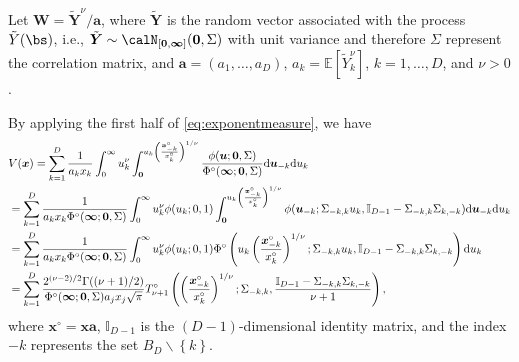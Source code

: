 \documentclass[12pt]{article}
\begin{document}
Let $\bm W= \tilde{\bm Y}^{\nu} / \bm a$, where $\tilde{\bm Y}$ is the random vector associated with the process $\tilde{Y}(\bs)$, i.e., $\tilde{\bm Y} \sim \calN_{\left[ \bm 0, \bm \infty\right]}(\bm 0, \Sigma)$ with unit variance and therefore $\Sigma$ represent the correlation matrix, and $\bm a = (a_1, \ldots, a_D)$, $a_k=\mathbb E[\tilde Y_k^\nu]$, $k=1, \ldots, D$, and $\nu>0$.

By applying the first half of \eqref{eq:exponentmeasure}, we have 
\begin{align}
& V(\bm x) = \sum_{k=1}^D\frac{1}{a_kx_k}\int_0^\infty u_k^\nu \int_{\bm 0}^{u_k \left(\frac{\bm x_{-k}^\circ}{x_{k}^\circ}\right)^{1/\nu}} \frac{\phi(\bm u;\bm 0, \Sigma)}{\Phi^\circ(\bm \infty;\bm 0, \Sigma)}\text d \bm u_{-k}\text d u_k \nonumber \\ 
&=\sum_{k=1}^D\frac{1}{a_k x_k \Phi^\circ(\bm \infty;\bm 0, \Sigma)}\int_0^\infty u_k^\nu \phi(u_k;0, 1) \int_{\bm 0}^{u_k\left(\frac{\bm x_{-k}^\circ}{x_k^\circ}\right)^{1/\nu}}\phi(\bm u_{-k}; \Sigma_{-k,k}u_k, \mathbb{I}_{D-1}-\Sigma_{-k,k}\Sigma_{k,-k})\text d \bm u_{-k}\text d u_k \nonumber \\ 
&=\sum_{k=1}^D\frac{1}{a_kx_k \Phi^\circ(\bm \infty;\bm 0, \Sigma)}\int_0^\infty u_k^\nu \phi(u_k; 0, 1) \Phi^\circ\left(u_k\left(\frac{\bm x_{-k}^\circ}{x_k^\circ}\right)^{1/\nu};\Sigma_{-k,k}u_k,\mathbb{I}_{D-1} -\Sigma_{-k,k}\Sigma_{k,-k}\right)\text d u_k \nonumber \\  
&=\sum_{k=1}^D \frac{2^{(\nu-2)/2} \Gamma((\nu+1)/2)}{\Phi^\circ(\bm \infty;\bm 0, \Sigma) a_jx_j \sqrt{\pi}} T_{\nu+1}^\circ\left(\left(\frac{\bm x_{-k}^\circ}{x_k^\circ}\right)^{1/\nu};\Sigma_{-k,k},\frac{\mathbb{I}_{D-1}-\Sigma_{-k,k}\Sigma_{k,-k}}{\nu+1}\right)
\label{eq:truncated_extremal_t_V},
\end{align}
where $\bm x^\circ = \bm x \bm a$, $\mathbb{I}_{D-1}$ is the $(D-1)$-dimensional identity matrix, and the index $-k$ represents the set $B_D \backslash \left\{ k\right\}$.
\end{document}
